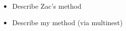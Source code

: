 \documentclass{aastex63}
\begin{document}
\begin{itemize}
\item Describe Zac's method
\item Describe my method (via multinest)
\end{itemize}

\end{document}
